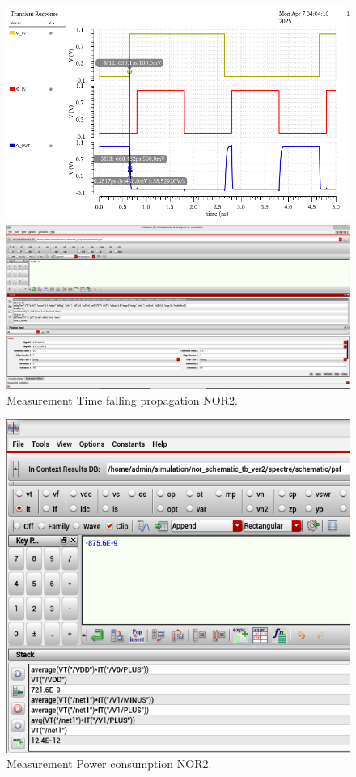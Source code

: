\begin{figure}[H]
	\begin{minipage}{0.5\linewidth}
		\includegraphics[width=\linewidth]{section/EX1/NOR/EX1_NOR2_Tpdf_Waveform.png}
	\end{minipage}
	\begin{minipage}{0.5\linewidth}
		\includegraphics[width=\linewidth]{section/EX1/NOR/EX1_NOR2_Tpdf_Cal.png}
	\end{minipage}
	\caption{Measurement Time falling propagation NOR2.}
\end{figure}

\begin{figure}[H]
	\centering
	\includegraphics[width=.7\linewidth]{section/EX1/NOR/EX1_NOR2_Power.png}
	\caption{Measurement Power consumption NOR2.}
\end{figure}

